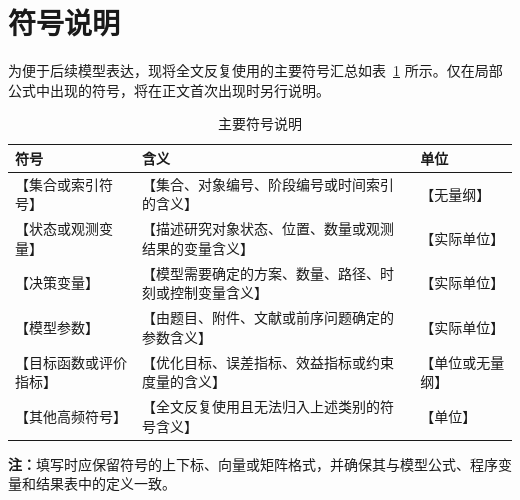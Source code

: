 %

\section{符号说明}

为便于后续模型表达，现将全文反复使用的主要符号汇总如表~\ref{tab:symbols} 所示。仅在局部公式中出现的符号，将在正文首次出现时另行说明。

\begin{table}[htbp]
  \centering
  \caption{主要符号说明}
  \label{tab:symbols}
  \renewcommand{\arraystretch}{1.25}
  \begin{tabular}{@{}
    >{\centering\arraybackslash}p{}
    >{\raggedright\arraybackslash}p{}
    >{\centering\arraybackslash}p{}@{}}
    \toprule
    \textbf{符号} & \centering\textbf{含义}\arraybackslash & \textbf{单位} \\
    \midrule
    【集合或索引符号】 & 【集合、对象编号、阶段编号或时间索引的含义】 & 【无量纲】 \\
    【状态或观测变量】 & 【描述研究对象状态、位置、数量或观测结果的变量含义】 & 【实际单位】 \\
    【决策变量】 & 【模型需要确定的方案、数量、路径、时刻或控制变量含义】 & 【实际单位】 \\
    【模型参数】 & 【由题目、附件、文献或前序问题确定的参数含义】 & 【实际单位】 \\
    【目标函数或评价指标】 & 【优化目标、误差指标、效益指标或约束度量的含义】 & 【单位或无量纲】 \\
    【其他高频符号】 & 【全文反复使用且无法归入上述类别的符号含义】 & 【单位】 \\
    \bottomrule
  \end{tabular}
\end{table}

\noindent\textbf{注：}填写时应保留符号的上下标、向量或矩阵格式，并确保其与模型公式、程序变量和结果表中的定义一致。
